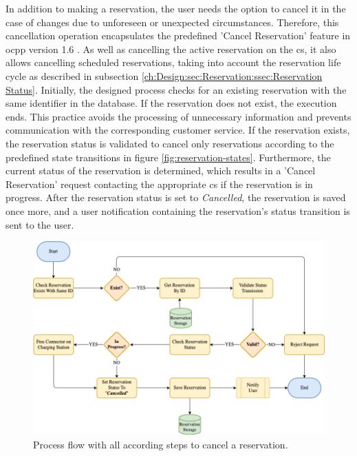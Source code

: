 In addition to making a reservation, the user needs the option to cancel it in the case of changes due to unforeseen or unexpected circumstances.
Therefore, this cancellation operation encapsulates the predefined 'Cancel Reservation' feature in \acrshort{ocpp} version 1.6 \cite{noauthor_ocpp_nodate}. As well as cancelling the active reservation on the \acrshort{cs}, it also allows cancelling  scheduled reservations, taking into account the reservation life cycle as described in subsection \ref{ch:Design:sec:Reservation:ssec:Reservation Status}.
Initially, the designed process checks for an existing reservation with the same identifier in the database. If the reservation does not exist, the execution ends. This practice avoids the processing of unnecessary information and prevents communication with the corresponding customer service.
If the reservation exists, the reservation status is validated to cancel only reservations according to the predefined state transitions in figure \ref{fig:reservation-states}. Furthermore, the current status of the reservation is determined, which results in a 'Cancel Reservation' request contacting the appropriate \acrshort{cs} if the reservation is in progress.
After the reservation status is set to \textit{Cancelled}, the reservation is saved once more, and a user notification containing the reservation's status transition is sent to the user.

\begin{figure}[h]
    \centering
    \includegraphics[scale=0.4]{resources/images/main/5_design/processes/ReservationCancel.png}
    \caption{Process flow with all according steps to cancel a reservation.}
    \label{fig:cancel-reservation-flowchart}
\end{figure}

